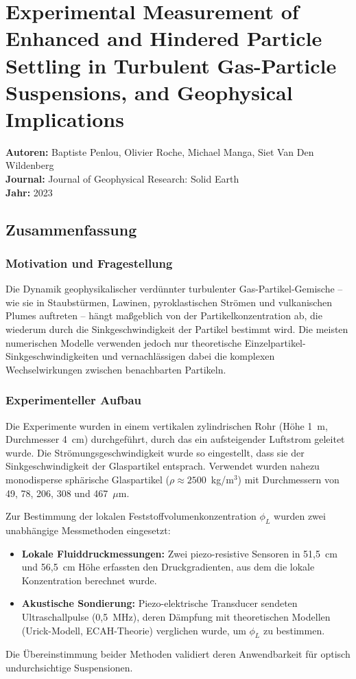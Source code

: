 \documentclass[a4paper,12pt]{article}
\begin{document}
\section*{Experimental Measurement of Enhanced and Hindered Particle Settling in Turbulent Gas-Particle Suspensions, and Geophysical Implications}

\textbf{Autoren:} Baptiste Penlou, Olivier Roche, Michael Manga, Siet Van Den Wildenberg \\
\textbf{Journal:} Journal of Geophysical Research: Solid Earth \\
\textbf{Jahr:} 2023

\subsection*{Zusammenfassung}

\subsubsection*{Motivation und Fragestellung}
Die Dynamik geophysikalischer verd\"unnter turbulenter Gas-Partikel-Gemische -- wie sie in Staubst\"urmen, Lawinen, pyroklastischen Str\"omen und vulkanischen Plumes auftreten -- h\"angt ma\ss{}geblich von der Partikelkonzentration ab, die wiederum durch die Sinkgeschwindigkeit der Partikel bestimmt wird. Die meisten numerischen Modelle verwenden jedoch nur theoretische Einzelpartikel-Sinkgeschwindigkeiten und vernachl\"assigen dabei die komplexen Wechselwirkungen zwischen benachbarten Partikeln.

\subsubsection*{Experimenteller Aufbau}
Die Experimente wurden in einem vertikalen zylindrischen Rohr (H\"ohe 1~m, Durchmesser 4~cm) durchgef\"uhrt, durch das ein aufsteigender Luftstrom geleitet wurde. Die Str\"omungsgeschwindigkeit wurde so eingestellt, dass sie der Sinkgeschwindigkeit der Glaspartikel entsprach. Verwendet wurden nahezu monodisperse sph\"arische Glaspartikel ($\rho \approx 2500$~kg/m$^3$) mit Durchmessern von 49, 78, 206, 308 und 467~$\mu$m.

Zur Bestimmung der lokalen Feststoffvolumenkonzentration $\phi_L$ wurden zwei unabh\"angige Messmethoden eingesetzt:
\begin{itemize}
    \item \textbf{Lokale Fluiddruckmessungen:} Zwei piezo-resistive Sensoren in 51,5~cm und 56,5~cm H\"ohe erfassten den Druckgradienten, aus dem die lokale Konzentration berechnet wurde.
    \item \textbf{Akustische Sondierung:} Piezo-elektrische Transducer sendeten Ultraschallpulse (0,5~MHz), deren D\"ampfung mit theoretischen Modellen (Urick-Modell, ECAH-Theorie) verglichen wurde, um $\phi_L$ zu bestimmen.
\end{itemize}
Die \"Ubereinstimmung beider Methoden validiert deren Anwendbarkeit f\"ur optisch undurchsichtige Suspensionen.
\end{document}
